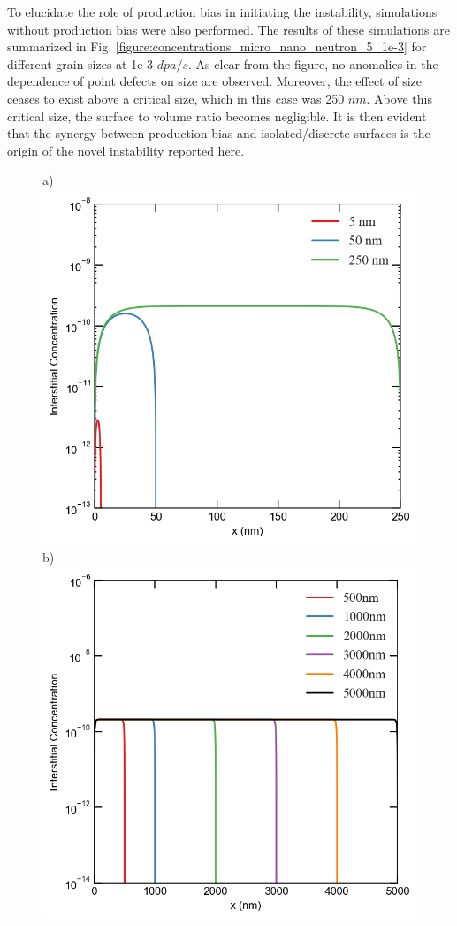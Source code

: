 \documentclass[utf8]{frontiersSCNS} %
\begin{document}
    To elucidate the role of production bias in initiating the instability, simulations without production bias were also performed. The results of these simulations are summarized in Fig. \ref{figure:concentrations_micro_nano_neutron_5_1e-3} for different grain sizes at 1e-3 $dpa/s$. As clear from the figure, no anomalies in the dependence of point defects on size are observed. Moreover, the effect of size ceases to exist above a critical size, which in this case was 250 $nm$. Above this critical size, the surface to volume ratio becomes negligible. It is then evident that the synergy between production bias and isolated/discrete surfaces is the origin of the novel instability reported here.
    
    \begin{figure}[h!]
        \centering
        a)\includegraphics[scale=0.55]{Fig4_a}
        b)\includegraphics[scale=0.55]{Fig4_b}

\end{figure}
\end{document}
